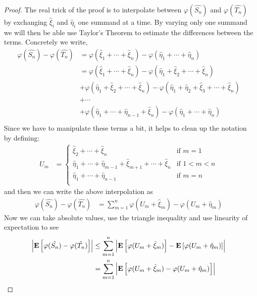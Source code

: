 \documentclass{amsart}
\theoremstyle{remark}
\theoremstyle{definition}
\begin{document}
\begin{proof}
The real trick of the proof is to interpolate between
$\varphi(\hat{S_n})$ and $\varphi(\hat{T_n})$ by exchanging
$\hat{\xi}_i$ and $\hat{\eta}_i$ one summand at a time.  By varying
only one summand we will then be able use Taylor's Theorem to
estimate the differences between the terms.  Concretely we write,
\begin{align*}
\varphi(\hat{S_n}) - \varphi(\hat{T_n}) &= \varphi(\hat{\xi}_1 + \cdots + \hat{\xi}_n) -
\varphi(\hat{\eta}_1 + \cdots + \hat{\eta}_n) \\
&= \varphi(\hat{\xi}_1 + \cdots + \hat{\xi}_n) - \varphi(\hat{\eta}_1 +
\hat{\xi}_2 + 
\cdots + \hat{\xi}_n) \\
&+ \varphi(\hat{\eta}_1 +
\hat{\xi}_2 +
\cdots + \hat{\xi}_n) - 
\varphi(\hat{\eta}_1 + \hat{\eta}_2 + \hat{\xi}_3 + \cdots + \hat{\xi}_n) \\
&+ \cdots\\
&+ \varphi(\hat{\eta}_1 +
\cdots  +
\hat{\eta}_{n-1} + \hat{\xi}_n) - 
\varphi(\hat{\eta}_1 + \cdots + \hat{\eta}_n) \\
\end{align*}
Since we have to manipulate these terms a bit, it helps to clean up
the notation by defining:
\begin{align*}
U_m &= \begin{cases}
\hat{\xi}_2 + \cdots + \hat{\xi}_n & \text{if $m=1$} \\
\hat{\eta}_1 + \cdots + \hat{\eta}_{m-1}+\hat{\xi}_{m+1} + \cdots +
\hat{\xi}_n & \text{if $1 < m<n$} \\
\hat{\eta}_1 + \cdots + \hat{\eta}_{n-1} & \text{if $m=n$} \\
\end{cases}
\end{align*}
and then we can write the above interpolation as 
\begin{align*}
\varphi(\hat{S_n}) - \varphi(\hat{T_n}) &= \sum_{m=1}^n \varphi(U_m + \hat{\xi}_m) -\varphi(U_m + \hat{\eta}_m)
\end{align*}
Now we can take absolute values, use the triangle inequality and use
linearity of expectation to see
\begin{align*}
\left \vert \textbf{E}\left[\varphi(\hat{S_n}) - \varphi(\hat{T_n})\right] \right \vert &\leq
\sum_{m=1}^n \left \vert \textbf{E}\left[\varphi(U_m + \hat{\xi}_m)\right]
  -\textbf{E}\left[\varphi(U_m + \hat{\eta}_m)\right] \right \vert\\
&=\sum_{m=1}^n \left \vert \textbf{E}\left[\varphi(U_m + \hat{\xi}_m)
  -\varphi(U_m + \hat{\eta}_m)\right] \right \vert
\end{align*}


\end{proof}
\end{document}
